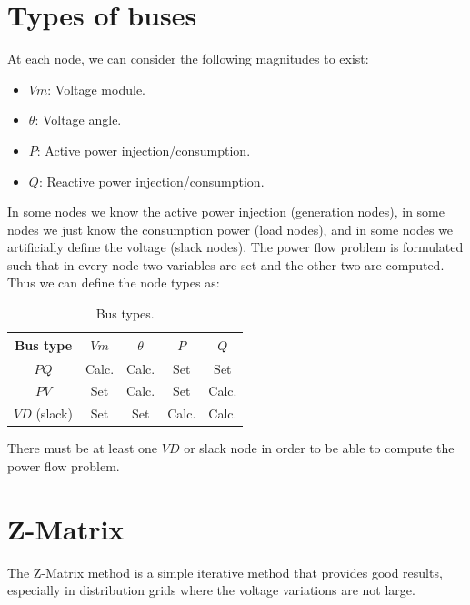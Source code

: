\documentclass[nols,a4paper,twoside,notoc,fleqn]{tufte-book}
\begin{document}
\section{Types of buses}

At each node, we can consider the following magnitudes to exist:
\begin{itemize}
	\item $Vm$: Voltage module.
	\item $\theta$: Voltage angle.
	\item $P$: Active power injection/consumption.
	\item $Q$: Reactive power injection/consumption.
\end{itemize}

In some nodes we know the active power injection (generation nodes), in some nodes we just know the consumption power (load nodes), and in some nodes we artificially define the voltage (slack nodes). The power flow problem is formulated such that in every node two variables are set and the other two are computed. Thus we can define the node types as:

\begin{table}[h!]
	\begin{center}
		\begin{tabular}{ccccc}
			\toprule
			
			Bus type & $Vm$ &  $\theta$ & $P$ & $Q$\\
			
			\midrule
			
			$PQ$ & Calc. &  Calc. & Set & Set\\
			$PV$ & Set &  Calc. & Set & Calc.\\
			$VD$ (slack) & Set &  Set & Calc. & Calc.\\
			
			
			\bottomrule
		\end{tabular}
	\end{center}
	\caption{Bus types.}
	\label{bus__types}
\end{table}

There must be at least one $VD$ or slack node in order to be able to compute the power flow problem. 



\section{Z-Matrix}

The Z-Matrix method is a simple iterative method that provides good results, especially in distribution grids where the voltage variations are not large.
\end{document}
